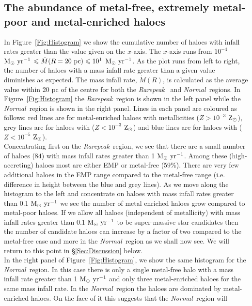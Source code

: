 \documentclass[graphics, twocolumn, usenatbib]{mn2e}
\newcommand{\msolaryr} {$\rm{M_{\odot}~yr^{-1}}~$}
\newcommand{\msolaryrc} {$\rm{M_{\odot}~yr^{-1}}$}
\newcommand{\zsolarc} {$\rm{Z_{\odot}}$}
\newcommand{\rarepeak} {\textit{Rarepeak~}}
\newcommand{\normal} {\textit{Normal~}}
\begin{document}
\subsection{The abundance of metal-free, extremely metal-poor and metal-enriched haloes}

In Figure~\ref{Fig:Histogram} we show the cumulative number of haloes with infall rates greater than
the value given on the $x$-axis. The $x$-axis runs from
$10^{-4}$ \msolaryr $\leq \dot{M}(R=20~{\rm pc}) \leq 10^{1}$ \msolaryrc. 
As the plot runs from left to right, the number of haloes with a
mass infall rate greater than a given value diminishes as expected. The mass infall rate,
$\dot{M}(R)$, is calculated as the average value within 20 pc of the centre for both the \rarepeak 
and \normal regions. In Figure~\ref{Fig:Histogram} the
\rarepeak region is shown in the left panel while the \normal region is shown in the right 
panel. Lines in each panel are coloured as follows: red lines are for metal-enriched haloes with
metallicities ($Z > 10^{-3}$ \zsolarc), grey lines are for haloes with ($Z < 10^{-3}$ \zsolarc) and
blue lines are for haloes with ($Z < 10^{-5}$ \zsolarc).\\
\indent Concentrating first on the \rarepeak region, we see that there are a small number of
haloes ($84$) with mass infall rates greater than 1 \msolaryrc. Among these (high-accreting)
haloes most are either EMP or metal-free (59\%). There are very few additional haloes in the
EMP range compared to the metal-free range (i.e. difference in height between the
blue and grey lines). As we move along the histogram to the
left and concentrate on haloes with mass infall rates greater than 0.1 \msolaryr we see the
number of metal enriched haloes grow compared to
metal-poor haloes. If we allow all haloes (independent of metallicity) with mass infall rates greater
than  0.1 \msolaryr to be super-massive star candidates then the number of candidate haloes can
increase by a factor of two compared to the metal-free case and more in the \normal region as we
shall now see. We will return to this point in \S \ref{Sec:Discussion} below. \\
\indent In the right panel of Figure~\ref{Fig:Histogram},
we show the same histogram for the \normal region. In this case there is only a single metal-free halo
with a mass infall rate greater than 1 \msolaryr and only three metal-enriched haloes for the
same mass infall rate. In the \normal region the haloes are dominated by metal-enriched haloes.
On the face of it this suggests that the \normal region will
\end{document}
